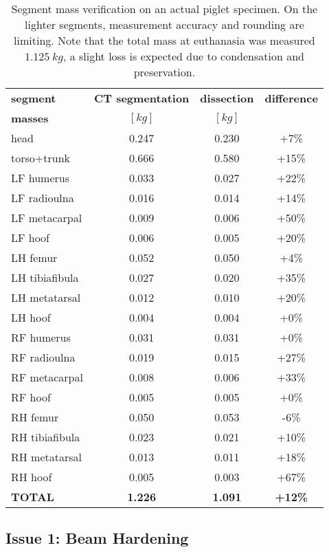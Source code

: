 \begin{table}[p]
\caption{\label{tab:pigletdissection}Segment mass verification on an actual piglet specimen. On the lighter segments, measurement accuracy and rounding are limiting. Note that the total mass at euthanasia was measured \(1.125\ kg\), a slight loss is expected due to condensation and preservation.}
\centering
\begin{tabular}{|l|c|c|c|}
\hline
\textbf{segment} & \textbf{CT segmentation} & \textbf{dissection} & \textbf{difference}\\[0pt]
\textbf{masses} & \([kg]\) & \([kg]\) & \\[0pt]
\hline
\hline
head & 0.247 & 0.230 & +7\%\\[0pt]
torso+trunk & 0.666 & 0.580 & +15\%\\[0pt]
LF humerus & 0.033 & 0.027 & +22\%\\[0pt]
LF radioulna & 0.016 & 0.014 & +14\%\\[0pt]
LF metacarpal & 0.009 & 0.006 & +50\%\\[0pt]
LF hoof & 0.006 & 0.005 & +20\%\\[0pt]
LH femur & 0.052 & 0.050 & +4\%\\[0pt]
LH tibiafibula & 0.027 & 0.020 & +35\%\\[0pt]
LH metatarsal & 0.012 & 0.010 & +20\%\\[0pt]
LH hoof & 0.004 & 0.004 & +0\%\\[0pt]
RF humerus & 0.031 & 0.031 & +0\%\\[0pt]
RF radioulna & 0.019 & 0.015 & +27\%\\[0pt]
RF metacarpal & 0.008 & 0.006 & +33\%\\[0pt]
RF hoof & 0.005 & 0.005 & +0\%\\[0pt]
RH femur & 0.050 & 0.053 & -6\%\\[0pt]
RH tibiafibula & 0.023 & 0.021 & +10\%\\[0pt]
RH metatarsal & 0.013 & 0.011 & +18\%\\[0pt]
RH hoof & 0.005 & 0.003 & +67\%\\[0pt]
\hline
\textbf{TOTAL} & \textbf{1.226} & \textbf{1.091} & \textbf{+12\%}\\[0pt]
\hline
\hline
\end{tabular}
\end{table}


\subsection{Issue 1: Beam Hardening}
\label{sec:orgfa4a267}

